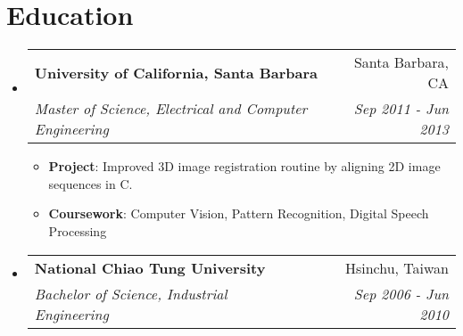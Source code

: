 \documentclass[letterpaper,12pt]{article}
\makeatletter
\newcommand{\resumeItem}[2]{
  \item\small{
    \textbf{#1}{: #2 \vspace{-2pt}}
  }
}
\newcommand{\resumeSubheading}[4]{
  \vspace{-1pt}\item
    \begin{tabular*}{0.97\textwidth}{l@{\extracolsep{\fill}}r}
      \textbf{#1} & #2 \\
      \textit{\small#3} & \textit{\small #4} \\
    \end{tabular*}\vspace{-5pt}
}
\newcommand{\resumeSubHeadingListStart}{\begin{itemize}[leftmargin=*]}
\newcommand{\resumeSubHeadingListEnd}{\end{itemize}}
\newcommand{\resumeItemListStart}{\begin{itemize}}
\newcommand{\resumeItemListEnd}{\end{itemize}\vspace{-5pt}}
\makeatother
\begin{document}
\section{Education}
  \resumeSubHeadingListStart
    \resumeSubheading
      {University of California, Santa Barbara}{Santa Barbara, CA}
      {Master of Science, Electrical and Computer Engineering}{Sep 2011 - Jun 2013}
    \resumeItemListStart
        \resumeItem{Project}
          {Improved 3D image registration routine by aligning 2D image sequences in C.}
        \resumeItem{Coursework}
          {Computer Vision, Pattern Recognition, Digital Speech Processing}
     \resumeItemListEnd
    \resumeSubheading
      {National Chiao Tung University}{Hsinchu, Taiwan}
      {Bachelor of Science, Industrial Engineering}{Sep 2006 - Jun 2010}
  \resumeSubHeadingListEnd
\end{document}
